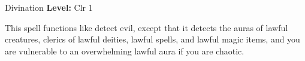 {Divination}
{
	\textbf{Level:}
	Clr 1\\
}
{
	This spell functions like detect evil, except that it detects the auras of lawful creatures, clerics of lawful deities, lawful spells, and lawful magic items, and you are vulnerable to an overwhelming lawful aura if you are chaotic.

}

